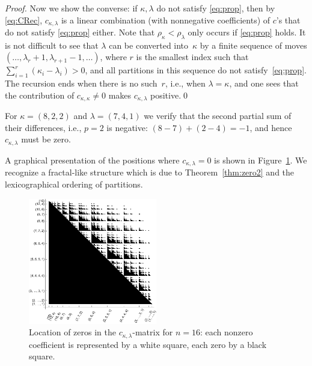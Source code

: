 \documentclass[smallextended]{svjour3}
\begin{document}
\begin{proof}
  Now we show the converse: if $\kappa,\lambda$ do not satisfy
  \eqref{eq:prop}, then by \eqref{eq:CRec}, $c_{\kappa,\lambda}$ is a linear
  combination (with nonnegative coefficients) of $c$'s that do not satisfy
  \eqref{eq:prop} either.  Note that $\rho_\kappa<\rho_\lambda$ only occurs if
  \eqref{eq:prop} holds. It is not difficult to see that $\lambda$ can be
  converted into~$\kappa$ by a finite sequence of moves
  $(\dots,\lambda_r+1,\lambda_{r+1}-1,\dots)$, where $r$ is the smallest index
  such that $\sum_{i=1}^r (\kappa_i - \lambda_i) > 0$, and all partitions in
  this sequence do not satisfy~\eqref{eq:prop}. The recursion ends when there
  is no such~$r$, i.e., when $\lambda=\kappa$, and one sees that the
  contribution of $c_{\kappa,\kappa}\neq0$ makes $c_{\kappa,\lambda}$ positive.\qed
\end{proof}

\begin{example}
  For $\kappa=(8,2,2)$ and $\lambda=(7,4,1)$ we verify that the second
  partial sum of their differences, i.e., $p=2$ is negative:
  $(8-7)+(2-4)=-1$, and hence $c_{\kappa,\lambda}$ must be zero.
\end{example}

A graphical presentation of the positions where $c_{\kappa,\lambda}=0$ is
shown in Figure~\ref{fig:zeros}. We recognize a fractal-like structure which
is due to Theorem~\ref{thm:zero2} and the lexicographical ordering of
partitions.

\begin{figure}
  \begin{center}
    \includegraphics[width=0.5\textwidth]{zeros.pdf}
  \end{center}
  \caption{Location of zeros in the $c_{\kappa,\lambda}$-matrix for $n=16$:
  each nonzero coefficient is represented by a white square, each zero
  by a black square.}
  \label{fig:zeros}
\end{figure}
\end{document}

